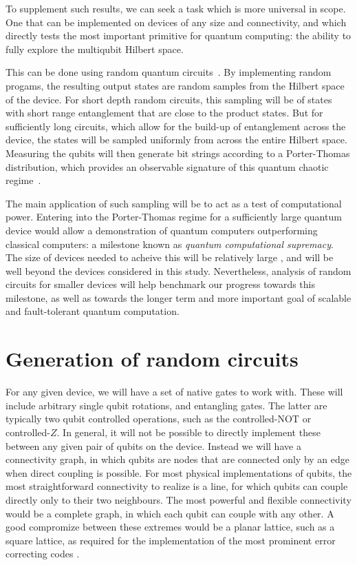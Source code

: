 \documentclass[aps,prl,twocolumn,showpacs,preprintnumbers]{revtex4-1}
\begin{document}
To supplement such results, we can seek a task which is more universal in scope. One that can be implemented on devices of any size and connectivity, and which directly tests the most important primitive for quantum computing: the ability to fully explore the multiqubit Hilbert space.

This can be done using random quantum circuits~\cite{boixo:18}. By implementing random progams, the resulting output states are random samples from the Hilbert space of the device. For short depth random circuits, this sampling will be of states with short range entanglement that are close to the product states. But for sufficiently long circuits, which allow for the build-up of entanglement across the device, the states will be sampled uniformly from across the entire Hilbert space. Measuring the qubits will then generate bit strings according to a Porter-Thomas distribution, which provides an observable signature of this quantum chaotic regime~\cite{boixo:18}.

The main application of such sampling will be to act as a test of computational power. Entering into the Porter-Thomas regime for a sufficiently large quantum device would allow a demonstration of quantum computers outperforming classical computers: a milestone known as \textit{quantum computational supremacy}. The size of devices needed to acheive this will be relatively large \cite{}, and will be well beyond the devices considered in this study. Nevertheless, analysis of random circuits for smaller devices will help benchmark our progress towards this milestone, as well as towards the longer term and more important goal of scalable and fault-tolerant quantum computation.


\section{Generation of random circuits}

For any given device, we will have a set of native gates to work with. These will include arbitrary single qubit rotations, and entangling gates. The latter are typically two qubit controlled operations, such as the controlled-NOT or controlled-$Z$. In general, it will not be possible to directly implement these between any given pair of qubits on the device. Instead we will have a connectivity graph, in which qubits are nodes that are connected only by an edge when direct coupling is possible. For most physical implementations of qubits, the most straightforward connectivity to realize is a line, for which qubits can couple directly only to their two neighbours. The most powerful and flexible connectivity would be a complete graph, in which each qubit can couple with any other. A good compromize between these extremes would be a planar lattice, such as a square lattice, as required for the implementation of the most prominent error correcting codes \cite{}.
\end{document}
